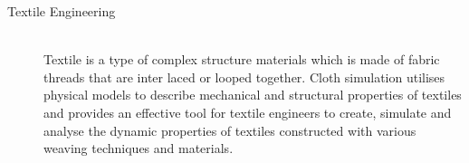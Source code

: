 \begin{description}
  
    \item[Textile Engineering] \hfill \\
    Textile is a type of complex structure materials which is made of fabric threads that are inter laced or looped together. Cloth simulation utilises physical models to describe mechanical and structural properties of textiles and provides an effective tool for textile engineers to create, simulate and analyse the dynamic properties of textiles constructed with various weaving techniques and materials.
    
\end{description}

%
%
%
%



